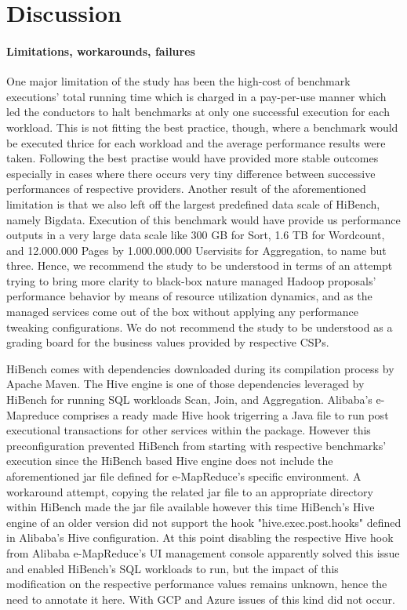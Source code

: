 \documentclass[review]{elsarticle}
\begin{document}
\section{Discussion}
\paragraph{Limitations, workarounds, failures}One major limitation of the study has been the high-cost of benchmark executions' total running time which is charged in a pay-per-use manner which led the conductors to halt benchmarks at only one successful execution for each workload. This is not fitting the best practice, though, where a benchmark would be executed thrice for each workload and the average performance results were taken. Following the best practise would have provided more stable outcomes especially in cases where there occurs very tiny difference between successive performances of respective providers. Another result of the aforementioned limitation is that we also left off the largest predefined data scale of HiBench, namely Bigdata. Execution of this benchmark would have provide us performance outputs in a very large data scale like 300 GB for Sort, 1.6 TB for Wordcount, and 12.000.000 Pages by 1.000.000.000 Uservisits for Aggregation, to name but three. Hence, we recommend the study to be understood in terms of an attempt trying to bring more clarity to black-box nature managed Hadoop proposals' performance behavior by means of resource utilization dynamics, and as the managed services come out of the box without applying any performance tweaking configurations. We do not recommend the study to be understood as a grading board for the business values provided by respective CSPs.

HiBench comes with dependencies downloaded during its compilation process by Apache Maven. The Hive engine is one of those dependencies leveraged by HiBench for running SQL workloads Scan, Join, and Aggregation. Alibaba's e-Mapreduce comprises a ready made Hive hook trigerring a Java file to run post executional transactions for other services within the package. However this preconfiguration prevented HiBench from starting with respective benchmarks' execution since the HiBench based Hive engine does not include the aforementioned jar file defined for e-MapReduce's specific environment. A workaround attempt, copying the related jar file to an appropriate directory within HiBench made the jar file available however this time HiBench's Hive engine of an older version did not support the hook "hive.exec.post.hooks" defined in Alibaba's Hive configuration. At this point disabling the respective Hive hook from Alibaba e-MapReduce's UI management console apparently solved this issue and enabled HiBench's SQL workloads to run, but the impact of this modification on the respective performance values remains unknown, hence the need to annotate it here. With GCP and Azure issues of this kind did not occur.
\end{document}
